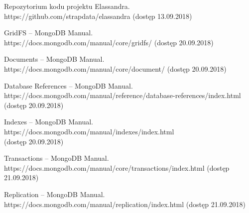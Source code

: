 \begin{thebibliography}{54}
    
 Repozytorium kodu projektu Elassandra.
https://github.com/strapdata/elassandra (dostęp 13.09.2018)

 GridFS -- MongoDB Manual. \\ https://docs.mongodb.com/manual/core/gridfs/ (dostęp 20.09.2018)

 Documents -- MongoDB Manual. https://docs.mongodb.com/manual/core/document/ (dostęp 20.09.2018)

 Database References -- MongoDB Manual. \\ 
https://docs.mongodb.com/manual/reference/database-references/index.html \\
(dostęp 20.09.2018)

 Indexes -- MongoDB Manual. https://docs.mongodb.com/manual/indexes/index.html \\ (dostęp 20.09.2018)

 Transactions -- MongoDB Manual. \\ https://docs.mongodb.com/manual/core/transactions/index.html (dostęp 21.09.2018)

 Replication -- MongoDB Manual. \\ https://docs.mongodb.com/manual/replication/index.html (dostęp 21.09.2018)
    
\end{thebibliography}